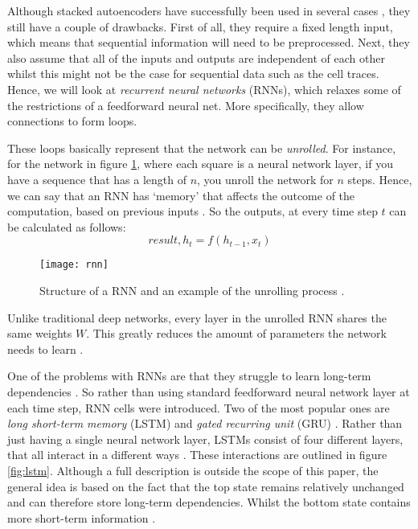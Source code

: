 Although stacked autoencoders have successfully been used in several cases \cite{deeplearningthesis,deeplearning2}, they still have a couple of drawbacks.
First of all, they require a fixed length input, which means that sequential information will need to be preprocessed.
Next, they also assume that all of the inputs and outputs are independent of each other \cite{britz_2016} whilst this might not be the case for sequential data such as the cell traces.
Hence, we will look at \textit{recurrent neural networks} (RNNs), which relaxes some of the restrictions of a feedforward neural net.
More specifically, they allow connections to form loops.

These loops basically represent that the network can be \textit{unrolled}.
For instance, for the network in figure \ref{fig:rnn}, where each square is a neural network layer, if you have a sequence that has a length of $n$, you unroll the network for $n$ steps.
Hence, we can say that an RNN has `memory' that affects the outcome of the computation, based on previous inputs \cite{britz_2016}.
So the outputs, at every time step $t$ can be calculated as follows:
$$\textit{result}, h_t = f(h_{t - 1}, x_t)$$

\begin{figure}[ht]
  \centering
  \texttt{[image: rnn]}
  \caption{Structure of a RNN and an example of the unrolling process \cite{britz_2016}.}
  \label{fig:rnn}
\end{figure}

Unlike traditional deep networks, every layer in the unrolled RNN shares the same weights $W$.
This greatly reduces the amount of parameters the network needs to learn \cite{britz_2016}.

One of the problems with RNNs are that they struggle to learn long-term dependencies \cite{bengio1994learning}.
So rather than using standard feedforward neural network layer at each time step, RNN cells were introduced.
Two of the most popular ones are \textit{long short-term memory} (LSTM) and \textit{gated recurring unit} (GRU) \cite{hochreiter1997long,LSTM,cho2014learning}.
Rather than just having a single neural network layer, LSTMs consist of four different layers, that all interact in a different ways \cite{LSTM}.
These interactions are outlined in figure \ref{fig:lstm}.
Although a full description is outside the scope of this paper, the general idea is based on the fact that the top state remains relatively unchanged and can therefore store long-term dependencies.
Whilst the bottom state contains more short-term information \cite{LSTM,hochreiter1997long}.

